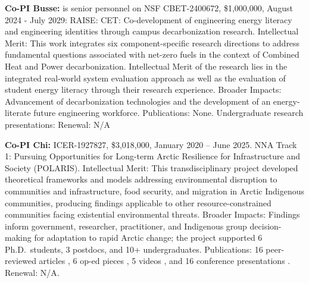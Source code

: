 \documentclass[11pt]{article}
\begin{document}
\noindent\textbf{Co-PI Busse:}
is senior personnel on NSF CBET-2400672, \$1,000,000, August 2024 - July 2029:
RAISE: CET: Co-development of engineering energy literacy and engineering identities through campus decarbonization research.
Intellectual Merit:
This work integrates six component-specific research directions to address fundamental questions associated with net-zero fuels in the context of Combined Heat and Power decarbonization.
Intellectual Merit of the research lies in the integrated real-world system evaluation approach as well as the evaluation of student energy literacy through their research experience. 
Broader Impacts:
Advancement of decarbonization technologies and the development of an energy-literate future engineering workforce.  
Publications: None.
Undergraduate research presentations: \cite{little2026}
Renewal: N/A

\noindent\textbf{Co-PI Chi:}
ICER-1927827, \$3,018,000, January 2020 -- June 2025.
NNA Track 1: Pursuing Opportunities for Long-term Arctic Resilience for Infrastructure and Society (POLARIS).
Intellectual Merit: This transdisciplinary project developed theoretical frameworks and models addressing environmental disruption to communities and infrastructure, food security, and migration in Arctic Indigenous communities, producing findings applicable to other resource-constrained communities facing existential environmental threats.
Broader Impacts: Findings inform government, researcher, practitioner, and Indigenous group decision-making for adaptation to rapid Arctic change; the project supported 6 Ph.D.\ students, 3 postdocs, and 10+ undergraduates.
Publications: 16 peer-reviewed articles \cite{yin2022tale, korkut2022addressing, Yin2022, Holen2022, Mucioki2024, Chi2024, Christian2024, Smith2024, Abdar2020, Holen2023, Mucioki2024b, Zhou2024, Mucioki2024c, Hamilton2024, Smith2023, Powell2023}, 6 op-ed pieces \cite{ArcticPOLARIS, Bogardus2024, Baldwin2023, AumanBauer2019, POLARIS, AumanBauer2020}, 5 videos \cite{WoodRiverBridge2022, StakesForStakeholders2022, POLARISTeam2021, ChevakSchool2024, ChevakAlaska2022}, and 16 conference presentations \cite{Smith2025, Maio2024, Yin2025, Maio2024b, Miller2024, Miller2021, Mucioki2024, Yin2024, Tickamyer2024, Tickamyer2025, Hamilton2024, Maio2024c, Chi2024, Mucioki2024b, Chi2025, Maio2024d}.
Renewal: N/A.
\newpage

\end{document}

